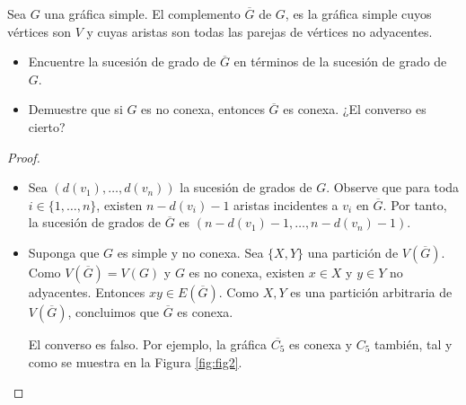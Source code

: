 \documentclass[12pt]{article}
\newenvironment{problem}[2][Problema]{\begin{trivlist}
\item[\hskip \labelsep {\bfseries #1}\hskip \labelsep {\bfseries #2.}]}{\end{trivlist}}
\begin{document}
\begin{problem}{1.1.17}
Sea $G$ una gráfica simple. El complemento $\overline{G}$ de $G$, es la gráfica simple cuyos vértices son $V$ y cuyas aristas son todas las parejas de vértices no adyacentes. \begin{itemize}
    \item[a)] Encuentre la sucesión de grado de $\overline{G}$ en términos de la sucesión de grado de $G$.
    \item[b)] Demuestre que si $G$ es no conexa, entonces $\overline{G}$ es conexa. ¿El converso es cierto?
\end{itemize}
\end{problem}
\begin{proof} \text{ }
\begin{itemize}
    \item[a)] Sea $(d(v_1), \ldots, d(v_n))$ la sucesión de grados de $G$. Observe que para toda $i \in \{1, \ldots, n\}$, existen $n - d(v_i) - 1$ aristas incidentes a $v_i$ en $\overline{G}$. Por tanto, la sucesión de grados de $\overline{G}$ es $(n-d(v_1)-1, \ldots, n-d(v_n)-1).$

    \item[b)] Suponga que $G$ es simple y no conexa. Sea $\{X,Y\}$ una partición de $V(\overline{G})$. Como $V(\overline{G}) = V(G)$ y $G$ es no conexa, existen $x\in X$ y $y \in Y$ no adyacentes. Entonces $xy \in E(\overline{G})$. Como $X, Y$ es una partición arbitraria de $V(\overline{G})$, concluimos que $\overline{G}$ es conexa. 
    
    El converso es falso. Por ejemplo, la gráfica $\overline{C_5}$ es conexa y  $C_5$ también, tal y como se muestra en la Figura \ref{fig:fig2}. 
\end{itemize}
\end{proof}
\end{document}
